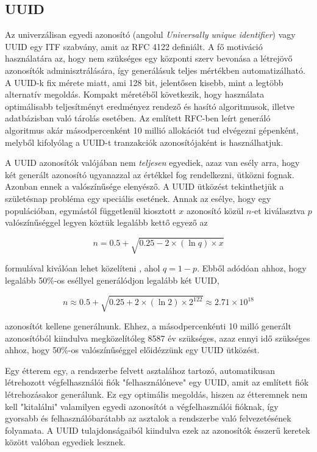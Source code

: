 \subsection{UUID}

Az univerzálisan egyedi azonosító (angolul \emph{Universally unique identifier}) vagy UUID egy ITF szabvány, amit az RFC 4122 definiált. A fő motiváció használatára az, hogy nem szükséges egy központi szerv bevonása a létrejövő azonosítók adminisztrálására, így generálásuk teljes mértékben automatizálható. A UUID-k fix mérete miatt, ami 128 bit, jelentősen kisebb, mint a legtöbb alternatív megoldás. Kompakt méretéből következik, hogy használata optimálisabb teljesítményt eredményez rendező és hasító algoritmusok, illetve adatbázisban való tárolás esetében. Az említett RFC-ben leírt generáló algoritmus akár másodpercenként 10 millió allokációt tud elvégezni gépenként, melyből kifolyólag a UUID-t tranzakciók azonosítójaként is használhatjuk. \par

A UUID azonosítók valójában nem \emph{teljesen} egyediek, azaz van esély arra, hogy két generált azonosító ugyanazzal az értékkel fog rendelkezni, ütközni fognak. Azonban ennek a valószínűsége elenyésző. A UUID ütközést tekinthetjük a születésnap probléma egy speciális esetének. Annak az esélye, hogy egy populációban, egymástól függetlenül kiosztott $x$ azonosító közül $n$-et kiválasztva $p$ valószínűséggel legyen köztük legalább kettő egyező az

\begin{equation*}
	n = 0.5 + \sqrt{0.25 - 2\times(\ln q)\times x}
\end{equation*}

formulával kiválóan lehet közelíteni \cite{mathis1991generalized}, ahol $q = 1 - p$. Ebből adódóan ahhoz, hogy legalább 50\%-os eséllyel generálódjon legalább két UUID,

\begin{equation*}
	n \approx 0.5 + \sqrt{0.25 + 2\times(\ln 2)\times2^{122}} \approx 2.71 \times 10^{18}
\end{equation*}

azonosítót kellene generálnunk. Ehhez, a másodpercenkénti 10 milló generált azonosítóból kiindulva megközelítóleg 8587 év szükséges, azaz ennyi idő szükséges ahhoz, hogy 50\%-os valószínűséggel előidézzünk egy UUID ütközést. \par

Egy étterem egy, a rendszerbe felvett asztalához tartozó, automatikusan létrehozott végfelhasználói fiók "felhasználóneve" egy UUID, amit az említett fiók létrehozásakor generálunk. Ez egy optimális megoldás, hiszen az étteremnek nem kell "kitalálni" valamilyen egyedi azonosítót a végfelhasználói fióknak, így gyorsabb és felhasználóbarátabb az asztalok a rendszerbe való felvezetésének folyamata. A UUID tulajdonságaiból kiindulva ezek az azonosítók ésszerű keretek között valóban egyediek lesznek.